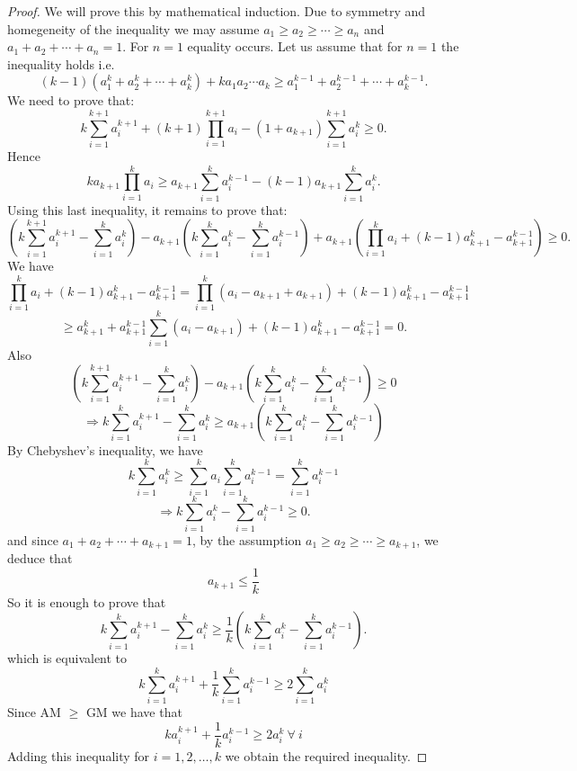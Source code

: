 \begin{proof}
  We will prove this by mathematical induction. Due to symmetry and homegeneity of the inequality we may assume $a_1\geq a_2\geq
  \cdots \geq a_n$ and $a_1 + a_2 + \cdots + a_n = 1$. For $n =1$ equality occurs. Let us assume that for $n = 1$ the inequality
  holds i.e. $$(k - 1)(a_1^k + a_2^k + \cdots + a_k^k) + ka_1a_2\cdots a_k\geq a_1^{k-1} + a_2^{k - 1} + \cdots + a_k^{k - 1}.$$
  We need to prove that:
  $$k\sum_{i=1}^{k+1}a_i^{k+1} + (k+1)\prod_{i=1}^{k+1}a_i - (1 + a_{k+1})\sum_{i=1}^{k+1}a_i^k\geq 0.$$
  Hence
  $$ka_{k+1}\prod_{i=1}^ka_i\geq a_{k+1}\sum_{i=1}^ka_i^{k-1} - (k-1)a_{k+1}\sum_{i=1}^ka_i^k.$$
  Using this last inequality, it remains to prove that:
  $$\left(k\sum_{i=1}^{k+1}a_i^{k+1} - \sum_{i=1}^ka_i^k\right) - a_{k+1}\left(k\sum_{i=1}^ka_i^k - \sum_{i=1}^ka_i^{k - 1}\right)
  + a_{k+1}\left(\prod_{i=1}^ka_i + (k - 1)a_{k+1}^k - a_{k+1}^{k-1}\right)\geq 0.$$
  We have $$\prod_{i=1}^k a_i + (k - 1)a_{k+1}^k - a_{k+1}^{k-1} = \prod_{i=1}^k(a_i - a_{k +1} + a_{k + 1}) + (k - 1)a_{k+1}^k - a_{k+1}^{k
    - 1}$$
  $$\geq a_{k+1}^k + a_{k+1}^{k-1}\sum_{i=1}^k(a_i - a_{k+1}) + (k - 1)a_{k+1}^k - a_{k+1}^{k-1} = 0.$$
  Also
  $$\left(k\sum_{i=1}^{k+1}a_i^{k+1} - \sum_{i=1}^ka_i^k\right) - a_{k+1}\left(k\sum_{i=1}^ka_i^k - \sum_{i=1}^ka_i^{k - 1}\right)
  \geq 0$$
  $$\Rightarrow k\sum_{i=1}^ka_i^{k+1} - \sum_{i=1}^ka_i^k\geq a_{k+1}\left(k\sum_{i=1}^ka_i^k - \sum_{i=1}^ka_i^{k - 1}\right)$$
  By Chebyshev's inequality, we have
  $$k\sum_{i=1}^ka_i^k\geq \sum_{i=1}^ka_i\sum_{i=1}^ka_i^{k-1} = \sum_{i=1}^ka_i^{k-1}$$
  $$\Rightarrow k\sum_{i=1}^ka_i^k - \sum_{i=1}^ka_i^{k-1}\geq 0.$$
  and since $a_1 + a_2 + \cdots + a_{k + 1} = 1$, by the assumption $a_1\geq a_2 \geq\cdots\geq a_{k +1}$, we deduce that $$a_{k +
    1}\leq \frac{1}{k}$$
  So it is enough to prove that
  $$k\sum_{i=1}^ka_i^{k+1} - \sum_{i=1}^k a_i^k\geq \frac{1}{k}\left(k\sum_{i=1}^ka_i^k - \sum_{i=1}^ka_i^{k - 1}\right).$$
  which is equivalent to
  $$k\sum_{i=1}^ka_i^{k+1} + \frac{1}{k}\sum_{i=1}^ka_i^{k-1}\geq 2\sum_{i=1}^ka_i^k$$
  Since AM $\geq$ GM we have that
  $$ka_i^{k+1} + \frac{1}{k}a_i^{k - 1}\geq 2a_i^k~\forall~i$$
  Adding this inequality for $i=1, 2, \ldots, k$ we obtain the required inequality.
\end{proof}

